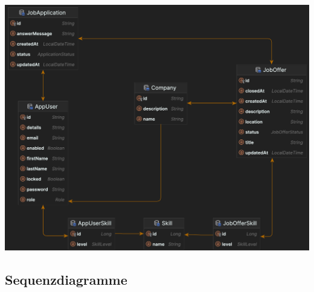 \documentclass[12pt, letterpaper]{article}
\begin{document}
    \includegraphics[scale=0.26]{erm2.png}

    \subsection{Sequenzdiagramme}
\end{document}
